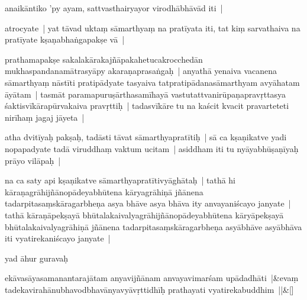\documentclass[article,12pt,a4paper]{memoir}%
\newcounter{parCount}
\begin{document}
	  \pstart \leavevmode%
	\label{thakur75-72.1}anaikāntiko 'py ayam, sattvasthairyayor virodhābhāvād iti |
	{}
	\pend%
      

	  \pstart \leavevmode%
	\label{thakur75-72.2}atrocyate | yat tāvad uktaṃ sāmarthyaṃ na pratīyata iti, tat kiṃ sarvathaiva na pratīyate kṣaṇabhaṅgapakṣe vā |
	{}
	\pend%
      

	  \pstart \leavevmode%
	\label{thakur75-72.4}prathamapakṣe sakalakārakajñāpakahetucakrocchedān mukhaspandanamātrasyāpy akaraṇaprasaṅgaḥ | anyathā yenaiva vacanena sāmarthyaṃ nāstīti pratipādyate tasyaiva tatpratipādanasāmarthyam avyāhatam āyātam | tasmāt paramapuruṣārthasamīhayā vastutattvanirūpaṇapravṛttasya śaktisvīkārapūrvakaiva pravṛttiḥ | tadasvīkāre tu na kaścit kvacit pravarteteti nirīhaṃ jagaj jāyeta |
	{}
	\pend%
      

	  \pstart \leavevmode%
	\label{thakur75-72.9}atha dvitīyaḥ pakṣaḥ, tadāsti tāvat sāmarthyapratītiḥ | sā ca kṣaṇikatve yadi nopapadyate tadā viruddhaṃ vaktum ucitam | asiddham iti tu nyāyabhūṣaṇīyaḥ prāyo vilāpaḥ |
	{}
	\pend%
      

	  \pstart \leavevmode%
	\label{thakur75-72.11}na ca saty api kṣaṇikatve sāmarthyapratītivyāghātaḥ | tathā hi kāraṇagrāhijñānopādeyabhūtena kāryagrāhiṇā jñānena tadarpitasaṃskāragarbheṇa asya bhāve asya bhāva ity anvayaniścayo janyate | tathā kāraṇāpekṣayā bhūtalakaivalyagrāhijñānopādeyabhūtena kāryāpekṣayā bhūtalakaivalyagrāhiṇā jñānena tadarpitasaṃskāragarbheṇa asyābhāve asyābhāva iti vyatirekaniścayo janyate |
	{}
	\pend%
      

	  \pstart \leavevmode%
	\label{thakur75-72.15}yad āhur guravaḥ
	{}
	\pend%
      
	    
	    \stanza[\smallbreak]
	  ekāvasāyasamanantarajātam anyavijñānam anvayavimarśam upādadhāti |&evaṃ tadekavirahānubhavodbhavānyavyāvṛttidhīḥ prathayati vyatirekabuddhim ||\&[\smallbreak]
	  
\end{document}
